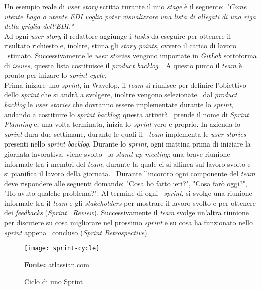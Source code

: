Un esempio reale di \emph{user story} scritta turante il mio \emph{stage} è il seguente: 
\newline
\emph{"Come utente Lago o utente EDI voglio poter visualizzare una lista di allegati di una riga della griglia dell’EDI."} \\

Ad ogni \emph{user story} il redattore aggiunge i \emph{tasks} da eseguire per ottenere il risultato richiesto e, inoltre, stima gli \emph{story points}, ovvero il carico di lavoro \
stimato. Successivamente le \emph{user stories} vengono importate in \emph{GitLab} sottoforma di \emph{issues}, questa lista costituisce il \emph{product backlog}. \
A questo punto il \emph{team} è pronto per inizare lo \emph{sprint cycle}. \\

Prima inizare uno \emph{sprint}, in Wavelop, il \emph{team} si riunisce per definire l'obiettivo dello \emph{sprint} che si andrà a svolgere, inoltre vengono selezionate \
dal \emph{product backlog} le \emph{user stories} che dovranno essere implementate durante lo \emph{sprint}, andando a costituire lo \emph{sprint backlog}; questa attività \
prende il nome di \emph{Sprint Planning} e, una volta terminata, inizia lo \emph{sprint} vero e proprio. In azienda lo \emph{sprint} dura due settimane, durante le quali il \
\emph{team} implementa le \emph{user stories} presenti nello \emph{sprint backlog}. Durante lo \emph{sprint}, ogni mattina prima di iniziare la giornata lavorativa, viene svolto \
lo \emph{stand up meeting}: una brave riunione informale tra i membri del \emph{team}, durante la quale ci si allinea sul lavoro svolto e si pianifica il lavoro della giornata. \
Durante l'incontro ogni componente del \emph{team} deve rispondere alle seguenti domande: "Cosa ho fatto ieri?", "Cosa farò oggi?", "Ho avuto qualche problema?". Al termine di ogni \
\emph{sprint}, si svolge una riunione informale tra il \emph{team} e gli \emph{\glspl{stakeholder}} per mostrare il lavoro svolto e per ottenere dei \emph{feedbacks} (\emph{Sprint \
Review}). Successivamente il \emph{team} svolge un'altra riunione per discutere su cosa migliorare nel prossimo \emph{sprint} e su cosa ha funzionato nello \emph{sprint} appena \
concluso (\emph{Sprint Retrospective}). 

\begin{figure}[!ht]
  \begin{center}
    \texttt{[image: sprint-cycle]}
    \caption{Ciclo di uno Sprint}
    \textbf{Fonte:} \href{https://www.atlassian.com}{atlassian.com}
  \end{center}
\end{figure}

